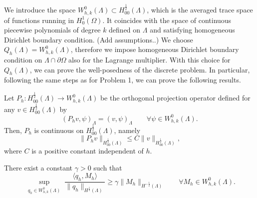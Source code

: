 We introduce the space
$W_{h,k}^0(\Lambda) \subset H^{\frac 12} _{00} (\Lambda)$, which is the averaged trace space of functions running in $H^1_0(\Omega)$. It coincides with the space of continuous piecewise polynomials of degree $k$ defined on $\Lambda$ and satisfying homogeneous Dirichlet boundary condition. {\color{red} (Add assumptions..)}
We choose $Q_h(\Lambda)=W_{h,k}^0(\Lambda)$, therefore we impose homogeneous Dirichlet boundary condition on $\Lambda \cap \partial \Omega$ also for the Lagrange multiplier. With this choice for $Q_h(\Lambda)$, we can prove the well-posedness of the discrete problem. In particular, following the same steps as for Problem 1, we can prove the following results.
\begin{lemma}
Let $P_h: H^{\frac 12}_{00}(\Lambda) \longrightarrow W_{h,k}^0(\Lambda)$ be the orthogonal projection operator defined  for any $v \in H^{\frac 12}_{00}(\Lambda)$ by
\begin{equation*}
(P_h v , \psi)_\Lambda= (v, \psi)_\Lambda \qquad \forall \psi \in W_{h,k}^0(\Lambda).  
\end{equation*} 
Then, $P_h$ is continuous on $H^{\frac 12}_{00}(\Lambda)$, namely
\begin{equation*}
\|P_h v\|_{H^{\frac 12}_{00}(\Lambda)} \leq C \|v\|_{H^{\frac 12}_{00}(\Lambda)},
\end{equation*}
where $C$ is a positive constant independent of $h$.
\end{lemma}

\begin{lemma}\label{infsup_avr_trspace}
There exist a constant $\gamma >0$ such that
\begin{equation*}
\sup_{\substack{q_h \in W_{h,k}^0(\Lambda)}} \frac{\langle q_h , M_h \rangle}{ \|q_h\|_{H^{\frac 12}(\Lambda)}} \geq \gamma \|M_h\|_{H^{-\frac 12}(\Lambda)} \qquad \forall M_h \in W_{h,k}^0(\Lambda).
\end{equation*} 
\end{lemma}

